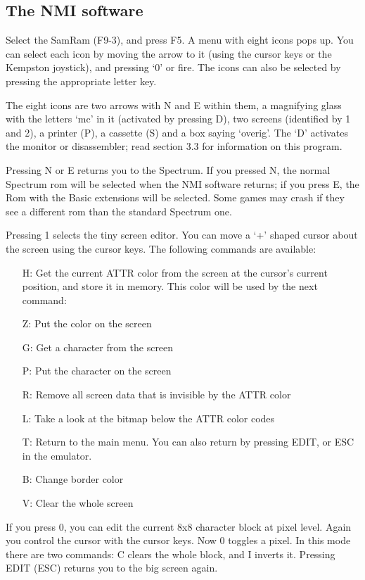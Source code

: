 \subsection{The NMI software}

    Select the SamRam (F9-3), and press F5.  A menu with eight icons pops
    up.  You can select each icon by moving the arrow to it (using the
    cursor keys or the Kempston joystick), and pressing `0' or fire.  The
    icons can also be selected by pressing the appropriate letter key.

    The eight icons are two arrows with N and E within them, a magnifying
    glass with the letters `mc' in it (activated by pressing D), two screens
    (identified by 1 and 2), a printer (P), a cassette (S) and a box saying
    `overig'.  The `D' activates the monitor or disassembler; read section
    3.3 for information on this program.

    Pressing N or E returns you to the Spectrum.  If you pressed N, the
    normal Spectrum rom will be selected when the NMI software returns; if
    you press E, the Rom with the Basic extensions will be selected.  Some
    games may crash if they see a different rom than the standard Spectrum
    one.

    Pressing 1 selects the tiny screen editor.  You can move a `+' shaped
    cursor about the screen using the cursor keys.  The following commands
    are available:
\begin{itemize}
  \item[H:] Get the current ATTR color from the screen at the cursor's
           current position, and store it in memory.  This color will be
           used by the next command:
  \item[Z:] Put the color on the screen
  \item[G:] Get a character from the screen
  \item[P:] Put the character on the screen
  \item[R:] Remove all screen data that is invisible by the ATTR color
  \item[L:] Take a look at the bitmap below the ATTR color codes
  \item[T:] Return to the main menu.  You can also return by pressing
           EDIT, or ESC in the emulator.
  \item[B:] Change border color
  \item[V:] Clear the whole screen
\end{itemize}
    If you press 0, you can edit the current 8x8 character block at pixel
    level.  Again you control the cursor with the cursor keys.  Now 0
    toggles a pixel.  In this mode there are two commands: C clears the
    whole block, and I inverts it.  Pressing EDIT (ESC) returns you to the
    big screen again.

